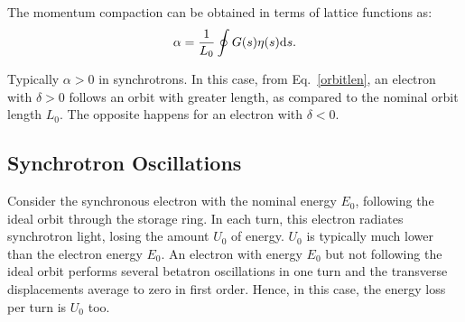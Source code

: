 The momentum compaction can be obtained in terms of lattice functions as:
\begin{equation}
    \alpha = \dfrac{1}{L_0}\oint G(s) \eta(s) \mathrm{d} s.
\end{equation}

Typically $\alpha > 0$ in synchrotrons. In this case, from Eq.~\eqref{orbitlen}, an electron with $\delta > 0$ follows an orbit with greater length, as compared to the nominal orbit length $L_0$. The opposite happens for an electron with $\delta < 0$. 

\subsection{Synchrotron Oscillations}
Consider the synchronous electron with the nominal energy $E_0$, following the ideal orbit through the storage ring. In each turn, this electron radiates synchrotron light, losing the amount $U_0$ of energy. $U_0$ is typically much lower than the electron energy $E_0$. An electron with energy $E_0$ but not following the ideal orbit performs several betatron oscillations in one turn and the transverse displacements average to zero in first order. Hence, in this case, the energy loss per turn is $U_0$ too. 

